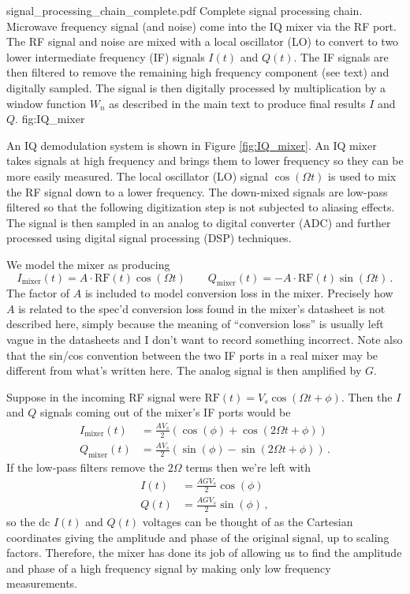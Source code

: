 
\quickwidefig{\columnwidth}
{signal_processing_chain_complete.pdf}
{Complete signal processing chain.
Microwave frequency signal (and noise) come into the IQ mixer via the RF port.
The RF signal and noise are mixed with a local oscillator (LO) to convert to two lower intermediate frequency (IF) signals $I(t)$ and $Q(t)$.
The IF signals are then filtered to remove the remaining high frequency component (see text) and digitally sampled.
The signal is then digitally processed by multiplication by a window function $W_n$ as described in the main text to produce final results $I$ and $Q$.}
{fig:IQ_mixer}

An IQ demodulation system is shown in Figure \ref{fig:IQ_mixer}.
An IQ mixer takes signals at high frequency and brings them to lower frequency so they can be more easily measured.
The local oscillator (LO) signal $\cos(\Omega t)$ is used to mix the RF signal down to a lower frequency.
The down-mixed signals are low-pass filtered so that the following digitization step is not subjected to aliasing effects.
The signal is then sampled in an analog to digital converter (ADC) and further processed using digital signal processing (DSP) techniques.

We model the mixer as producing
\begin{equation}
  I_\text{mixer}(t) = A \cdot \text{RF}(t) \cos(\Omega t) \qquad
  Q_\text{mixer}(t) = -A \cdot \text{RF}(t) \sin(\Omega t) \, .
\end{equation}
The factor of $A$ is included to model conversion loss in the mixer.
Precisely how $A$ is related to the spec'd conversion loss found in the mixer's datasheet is not described here, simply because the meaning of ``conversion loss'' is usually left vague in the datasheets and I don't want to record something incorrect.
Note also that the sin/cos convention between the two IF ports in a real mixer may be different from what's written here.
The analog signal is then amplified by $G$.


Suppose in the incoming RF signal were $\text{RF}(t) = V_s \cos(\Omega t + \phi)$.
Then the $I$ and $Q$ signals coming out of the mixer's IF ports would be
\begin{align*}
  I_\text{mixer}(t) &= \frac{A V_s}{2} \left( \cos(\phi) + \cos(2\Omega t + \phi) \right) \\
  Q_\text{mixer}(t) &= \frac{A V_s}{2} \left( \sin(\phi) - \sin(2\Omega t + \phi) \right) \, .
\end{align*}
If the low-pass filters remove the $2 \Omega$ terms then we're left with
\begin{align}
  I(t) &= \frac{A G V_s}{2} \cos(\phi) \nonumber \\
  Q(t) &= \frac{A G V_s}{2} \sin(\phi) \, ,
\end{align}
so the dc $I(t)$ and $Q(t)$ voltages can be thought of as the Cartesian coordinates giving the amplitude and phase of the original signal, up to scaling factors.
Therefore, the mixer has done its job of allowing us to find the amplitude and phase of a high frequency signal by making only low frequency measurements.

